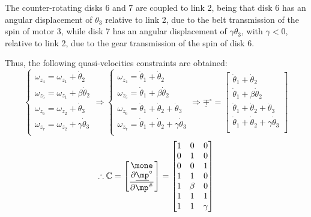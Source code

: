 \documentclass[a4paper,11pt,brazil,fleqn]{article}
\begin{document}
The counter-rotating disks 6 and 7 are coupled to link 2, being that disk 6 has an angular displacement of $\theta_3$ relative to link 2, due to the belt transmission of the spin of motor 3, while disk 7 has an angular displacement of $\gamma\theta_3$, with $\gamma < 0$, relative to link 2, due to the gear transmission of the spin of disk 6.

Thus, the following quasi-velocities constraints are obtained:
\begin{equation}\label{eq:Quasi-velocitiesConstraints1}
\begin{cases}
\omega_{z_4} = \omega_{z_1} + \dot{\theta}_2 \\
\omega_{z_5} = \omega_{z_1} + \beta\dot{\theta}_2 \\
\omega_{z_6} = \omega_{z_2} + \dot{\theta}_3 \\
\omega_{z_7} = \omega_{z_2} + \gamma\dot{\theta}_3 \\
\end{cases}
\Rightarrow
\begin{cases}
\omega_{z_4} = \dot{\theta}_1 + \dot{\theta}_2 \\
\omega_{z_5} = \dot{\theta}_1 + \beta\dot{\theta}_2 \\
\omega_{z_6} = \dot{\theta}_1 + \dot{\theta}_2 + \dot{\theta}_3 \\
\omega_{z_7} = \dot{\theta}_1 + \dot{\theta}_2 + \gamma\dot{\theta}_3 \\
\end{cases}
\Rightarrow
\underline{\mp}^\circ = 
\begin{bmatrix}
\dot{\theta}_1 + \dot{\theta}_2 \\
\dot{\theta}_1 + \beta\dot{\theta}_2 \\
\dot{\theta}_1 + \dot{\theta}_2 + \dot{\theta}_3 \\
\dot{\theta}_1 + \dot{\theta}_2 + \gamma\dot{\theta}_3 \\
\end{bmatrix}
\end{equation}
\begin{equation}\label{eq:C1}
\therefore\mC =
\begin{bmatrix}
\mone \\
\displaystyle\frac{\partial \underline{\mp}^\circ}{\partial \mp\ssh}
\end{bmatrix}  =
\begin{bmatrix}
1 & 0 & 0 \\
0 & 1 & 0 \\
0 & 0 & 1 \\
1 & 1     & 0 \\
1 & \beta & 0 \\
1 & 1     & 1 \\
1 & 1     & \gamma \\
\end{bmatrix} 
\end{equation}
\end{document}
